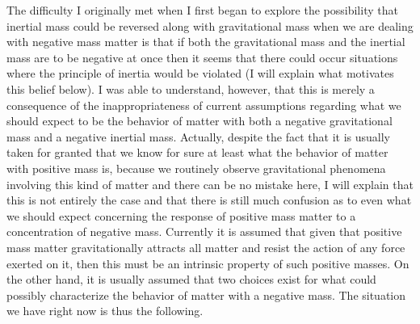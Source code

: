 \documentclass[notitlepage,12pt]{report}
\begin{document}
The difficulty I originally met when I first began to explore the possibility that inertial mass could be reversed along with gravitational mass when we are dealing with negative mass matter is that if both the gravitational mass and the inertial mass are to be negative at once then it seems that there could occur situations where the principle of inertia would be violated (I will explain what motivates this belief below). I was able to understand, however, that this is merely a consequence of the inappropriateness of current assumptions regarding what we should expect to be the behavior of matter with both a negative gravitational mass and a negative inertial mass. Actually, despite the fact that it is usually taken for granted that we know for sure at least what the behavior of matter with positive mass is, because we routinely observe gravitational phenomena involving this kind of matter and there can be no mistake here, I will explain that this is not entirely the case and that there is still much confusion as to even what we should expect concerning the response of positive mass matter to a concentration of negative mass. Currently it is assumed that given that positive mass matter gravitationally attracts all matter and resist the action of any force exerted on it, then this must be an intrinsic property of such positive masses. On the other hand, it is usually assumed that two choices exist for what could possibly characterize the behavior of matter with a negative mass. The situation we have right now is thus the following.
\end{document}
